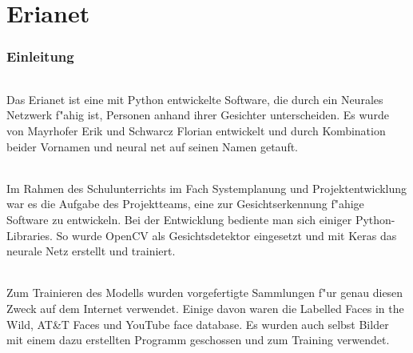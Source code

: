 \documentclass[12pt]{article}
\begin{document}
\tableofcontents
\newpage

\part{Erianet}
\section{Einleitung}
\paragraph{}
Das Erianet ist eine mit Python entwickelte Software, die
durch ein Neurales Netzwerk f"ahig ist,
Personen anhand ihrer Gesichter unterscheiden.
Es wurde von Mayrhofer Erik und Schwarcz Florian
entwickelt und durch Kombination beider Vornamen und \glqq neural net\grqq{}
auf seinen Namen getauft.
\paragraph{}
Im Rahmen des Schulunterrichts im Fach \glqq Systemplanung und Projektentwicklung\grqq{}
war es die Aufgabe des Projektteams, eine zur Gesichtserkennung
f"ahige Software zu entwickeln.
Bei der Entwicklung bediente man sich einiger Python-Libraries.
So wurde OpenCV als Gesichtsdetektor eingesetzt und mit Keras das neurale
Netz erstellt und trainiert.
\paragraph{}
Zum Trainieren des Modells wurden vorgefertigte Sammlungen f"ur genau diesen
Zweck auf dem Internet verwendet. Einige davon waren die \glqq Labelled Faces in the Wild\grqq{},
\glqq AT\&T Faces\grqq{} und \glqq YouTube face database\grqq{}. Es wurden
auch selbst Bilder mit einem dazu erstellten Programm geschossen und zum Training verwendet.
\newpage
\end{document}
